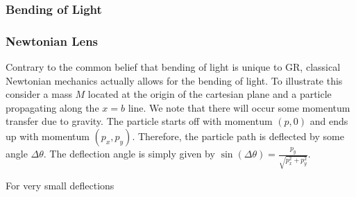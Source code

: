 \subsubsection{Bending of Light}
\subsubsection{Newtonian Lens}
Contrary to the common belief that bending of light is unique to GR, classical Newtonian mechanics actually allows for the bending of light. To illustrate this 
consider a mass $M$ located at the origin of the cartesian plane and a particle propagating along the $x=b$ line.
We note that there will occur some momentum transfer due to gravity. The particle starts off with momentum $(p,0)$ and ends up with momentum $(p_x,p_y)$.
Therefore, the particle path is deflected by some angle $\Delta \theta$. The deflection angle is simply given by $\sin(\Delta \theta) = \frac{p_y}{\sqrt{p_x^2+p_y^2}}$.
\par For very small deflections

